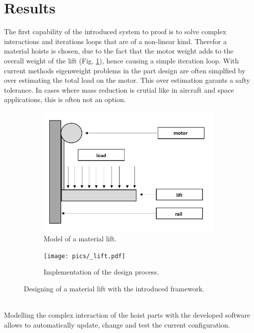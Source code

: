 \section{Results}
The first capability of the introduced system to proof is 
to solve complex interactions and iterations loops that are of a non-linear kind.
Therefor a material hoists is chosen, 
due to the fact that the motor weight adds 
to the overall weight of the lift (Fig. \ref{pic:lift_model}), 
hence causing a simple iteration loop.
With current methods eigenweight problems in the part design are often simplfied 
by over estimating the total load on the motor.
This over estimation garants a safty tolerance.
In cases where mass reduction is crutial like in aircraft and space applications, this is often not an option.
\begin{figure}[h]
    \centering
    \begin{subfigure}[b]{0.55\textwidth}
        \centering
        \includegraphics[width=\textwidth]{pics/500Z_model.png}
        \caption{\label{pic:lift_model} Model of a material lift.}
    \end{subfigure}
    \hfill
    \begin{subfigure}[b]{0.95\textwidth}
        \centering
        \texttt{[image: pics/\_lift.pdf]}
        \caption{\label{pic:lift_solu} Implementation of the design process.}
    \end{subfigure}
    \caption{\label{pic:lift} Designing of a material lift with the introduced framework.}
\end{figure}\\
Modelling the complex interaction of the hoist parts with the developed software allows to automatically update, change and test the current configuration.
